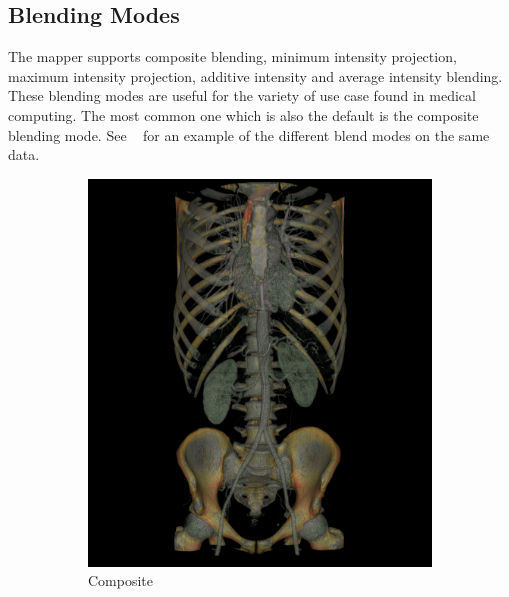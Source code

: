 \subsection{Blending Modes}
\label{blending-modes}
The mapper supports composite blending, minimum intensity projection, maximum
intensity projection, additive intensity and average intensity blending.
These blending modes are useful for the variety of use case found in medical computing.
The most common one which is also the default is the composite blending mode.
See ~ for an example of the different blend modes
on the same data.

\begin{figure}[htb]
  \centering%
  \begin{subfigure}{.5\columnwidth}
    \includegraphics[width=\columnwidth]{TorsoBlendingComposite.png}
    \caption{Composite}
    \label{fig:blendcomposite}
  \end{subfigure}%
  \begin{subfigure}{.5\columnwidth}

\end{subfigure}
\end{figure}
